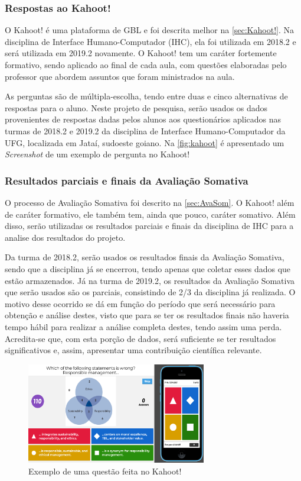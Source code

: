 \subsubsection{Respostas ao Kahoot!}
O Kahoot! é uma plataforma de GBL e foi descrita melhor na \autoref{sec:Kahoot!}. Na disciplina de Interface Humano-Computador (IHC), ela foi utilizada em 2018.2 e será utilizada em 2019.2 novamente. O Kahoot! tem um caráter fortemente formativo, sendo aplicado ao final de cada aula, com questões elaboradas pelo professor que abordem assuntos que foram ministrados na aula. 

As perguntas são de múltipla-escolha, tendo entre duas e cinco alternativas de respostas para o aluno. Neste projeto de pesquisa, serão usados os dados provenientes de respostas dadas pelos alunos aos questionários aplicados nas turmas de 2018.2 e 2019.2 da disciplina de Interface Humano-Computador da UFG, localizada em Jataí, sudoeste goiano. Na \autoref{fig:kahoot} é apresentado um \textit{Screenshot} de um exemplo de pergunta no Kahoot!

\subsubsection{Resultados parciais e finais da Avaliação Somativa}

O processo de Avaliação Somativa foi descrito na \autoref{sec:AvaSom}. O Kahoot! além de caráter formativo, ele também tem, ainda que pouco, caráter somativo. Além disso, serão utilizadas os resultados parciais e finais da disciplina de IHC para a analise dos resultados do projeto.

Da turma de 2018.2, serão usados os resultados finais da Avaliação Somativa, sendo que a disciplina já se encerrou, tendo apenas que coletar esses dados que estão armazenados. Já na turma de 2019.2, os resultados da Avaliação Somativa que serão usados são os parciais, consistindo de 2/3 da disciplina já realizada. O motivo desse ocorrido se dá em função do período que será necessário para obtenção e análise destes, visto que para se ter os resultados finais não haveria tempo hábil para realizar a análise completa destes, tendo assim uma perda. Acredita-se que, com esta porção de dados, será suficiente se ter resultados significativos e, assim, apresentar uma contribuição científica relevante.

\begin{figure}
    \centering
    \includegraphics[width=0.7\textwidth]{modelo-monografia-rej-2018/img/KahootScreenshot.png}
    \caption{Exemplo de uma questão feita no Kahoot!}
    \label{fig:kahoot}
\end{figure}
 
